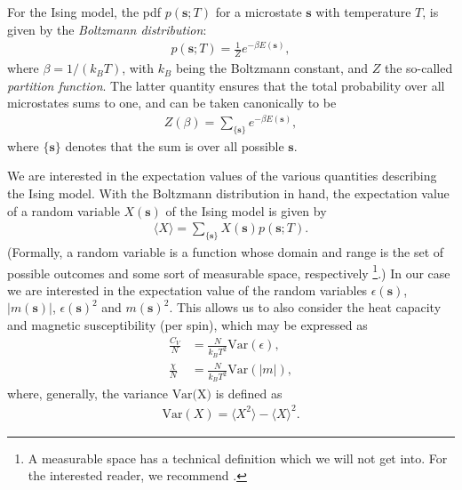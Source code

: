 \documentclass[english,notitlepage,reprint]{revtex4-2}  %
\renewcommand{\vec}[1]{\mathbf{#1}}
\begin{document}
For the Ising model, the \gls{pdf} \(p(\vec{s}; T)\) for a microstate \(\vec{s}\) with temperature \(T\), is given by the \emph{Boltzmann distribution}:
\begin{align}
    p(\vec{s}; T) = \frac{1}{Z}e^{-\beta E(\vec{s})},   \label{eq:Boltzmann_distribution}
\end{align}
where \(\beta = 1/(k_BT)\), with \(k_B\) being the Boltzmann constant, and \(Z\) the so-called \emph{partition function}. The latter quantity ensures that the total probability over all microstates sums to one, and can be taken canonically to be
\begin{align}
    Z(\beta) = \sum_{\{\vec{s}\}} e^{-\beta E(\vec{s})},   \label{eq:partition_function}
\end{align}
where \(\{\vec{s}\}\) denotes that the sum is over all possible \(\vec{s}\). 

We are interested in the expectation values of the various quantities describing the Ising model.  
With the Boltzmann distribution in hand, the expectation value of a random variable \(X(\vec{s})\) of the Ising model is given by 
\begin{align}
    \langle X\rangle = \sum_{\{\vec{s}\}} X(\vec{s}) p(\vec{s}; T). \label{eq:general_expectation_vaue}
\end{align}
(Formally, a random variable is a function whose domain and range is the set of possible outcomes and some sort of measurable space, respectively \footnote{A measurable space has a technical definition which we will not get into. For the interested reader, we recommend \cite{Schilling_2005}.}.) 
In our case we are interested in the expectation value of the random variables \(\epsilon(\vec{s})\), \(|m(\vec{s})|\), \(\epsilon(\vec{s})^2\) and \(m(\vec{s})^2\). 
This allows us to also consider the heat capacity and magnetic susceptibility (per spin), which may be expressed as 
\begin{subequations}
    \begin{align}
        \frac{C_V}{N} &= \frac{N}{k_BT^2}\text{Var}(\epsilon), \label{eq:C_V_definition}\\ 
        \frac{\chi}{N} &= \frac{N}{k_BT^2}\text{Var}(|m|), \label{eq:chi_definition}
    \end{align}
\end{subequations}
where, generally, the variance $\text{Var(X)}$ is defined as
\begin{align}
    \text{Var}(X) = \langle X^2\rangle - \langle X\rangle^2.
\end{align}
\end{document}
